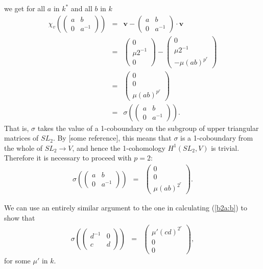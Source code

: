 we get for all $a$ in $k^*$ and all $b$ in $k$
\begin{eqnarray*}
\chi_v\left(
\left(\begin{matrix}a & b \\ 0 & a^{-1}\end{matrix}\right)
\right) &=&
\mathbf{v}-\left(\begin{matrix}a & b \\ 0 & a^{-1}\end{matrix}\right)\cdot \mathbf{v} \\
&=&
\left(\begin{matrix} 0 \\ \mu2^{-1} \\ 0 \end{matrix}\right) - 
\left(\begin{matrix} 0 \\ \mu2^{-1}\ \\ -\mu(ab)^{p^r} \end{matrix}\right)
 \\
&=&
\left(\begin{matrix} 0 \\ 0 \\ \mu(ab)^{p^r} \end{matrix}\right) \\
&=&
\sigma\left(
\left(\begin{matrix} a & b \\ 0 & a^{-1}\end{matrix}\right)
\right).
\end{eqnarray*}
That is, $\sigma$ takes the value of a 1-coboundary on the subgroup of upper triangular matrices of $SL_2$. By [some reference], this means that $\sigma$ is a 1-coboundary from the whole of $SL_2 \rightarrow V$, and hence the 1-cohomology $H^1(SL_2, V)$ is trivial. Therefore it is necessary to proceed with $p=2$:
\begin{eqnarray}
\label{b2a:b}
\sigma\left(
	\left(\begin{matrix} a & b \\ 0 & a^{-1}\end{matrix}\right)
\right) 
&=&
\left(\begin{matrix} 0 \\ 0 \\ \mu(ab)^{2^{r}}\end{matrix}\right).
\end{eqnarray}

We can use an entirely similar argument to the one in calculating (\ref{b2a:b}) to show that
\begin{eqnarray*}
\sigma\left(
	\left(\begin{matrix} d^{-1} & 0 \\ c & d\end{matrix}\right)
\right) &=&
\left(\begin{matrix} \mu'(cd)^{2^{r}} \\ 0 \\ 0 \end{matrix}\right),
\end{eqnarray*}
for some $\mu'$ in $k$. 

